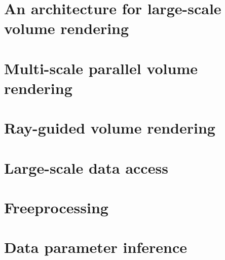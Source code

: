 \documentclass[12pt]{report}
\begin{document}


\chapter{An architecture for large-scale volume rendering}


\chapter{Multi-scale parallel volume rendering}


\chapter{Ray-guided volume rendering}


\chapter{Large-scale data access}


\chapter{Freeprocessing}


\chapter{Data parameter inference}

\end{document}
